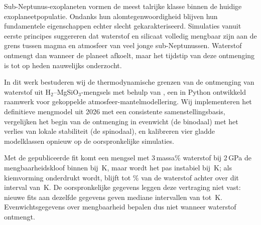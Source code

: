 \begin{narrowtext}
Sub-Neptunus-exoplaneten vormen de meest talrijke klasse binnen de huidige
exoplaneetpopulatie. Ondanks hun alomtegenwoordigheid blijven hun fundamentele
eigenschappen echter slecht gekarakteriseerd. Simulaties vanuit eerste principes suggereren
dat waterstof en silicaat volledig mengbaar zijn aan de grens tussen magma en atmosfeer van
veel jonge sub-Neptunussen. Waterstof ontmengt dan wanneer de planeet afkoelt, maar het
tijdstip van deze ontmenging is tot op heden nauwelijks onderzocht.\par
\vspace{3pt}
In dit werk bestuderen wij de thermodynamische grenzen van de ontmenging van waterstof uit
H$_2$--MgSiO$_3$-mengsels met behulp van \Atm{}, een in Python ontwikkeld raamwerk voor
gekoppelde atmosfeer-mantelmodellering. Wij implementeren het definitieve mengmodel uit 2026
met een consistente samenstellingsbasis, vergelijken het begin van de ontmenging in evenwicht
(de binodaal) met het verlies van lokale stabiliteit (de spinodaal), en kalibreren vier gladde
modelklassen opnieuw op de oorspronkelijke simulaties.\par
\vspace{3pt}
Met de gepubliceerde fit komt een mengsel met 3\,massa\% waterstof bij 2\,GPa de
mengbaarheidskloof binnen bij \pubTbTwo{}\,K, maar wordt het pas instabiel bij
\pubTspTwo{}\,K; als kiemvorming onderdrukt wordt, blijft tot \pubFhTwo{}\% van de waterstof
achter over dit interval van \pubIntTwo{}\,K. De oorspronkelijke gegevens leggen deze
vertraging niet vast: nieuwe fits aan dezelfde gegevens geven mediane intervallen van
\IntRangeLo{} tot \IntRangeHi{}\,K. Evenwichtsgegevens over mengbaarheid bepalen dus niet
wanneer waterstof ontmengt.
\end{narrowtext}
